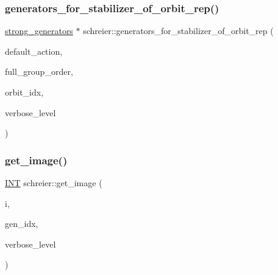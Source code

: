 \subsubsection{\texorpdfstring{generators\+\_\+for\+\_\+stabilizer\+\_\+of\+\_\+orbit\+\_\+rep()}{generators\_for\_stabilizer\_of\_orbit\_rep()}}
{\footnotesize\ttfamily \mbox{\hyperlink{classstrong__generators}{strong\+\_\+generators}} $\ast$ schreier\+::generators\+\_\+for\+\_\+stabilizer\+\_\+of\+\_\+orbit\+\_\+rep (\begin{DoxyParamCaption}\item[{\mbox{\hyperlink{classaction}{action}} $\ast$}]{default\+\_\+action,  }\item[{\mbox{\hyperlink{classlonginteger__object}{longinteger\+\_\+object}} \&}]{full\+\_\+group\+\_\+order,  }\item[{\mbox{\hyperlink{galois_8h_a09fddde158a3a20bd2dcadb609de11dc}{I\+NT}}}]{orbit\+\_\+idx,  }\item[{\mbox{\hyperlink{galois_8h_a09fddde158a3a20bd2dcadb609de11dc}{I\+NT}}}]{verbose\+\_\+level }\end{DoxyParamCaption})}

\mbox{\label{classschreier_a1fd2d08cb31c9e4357e124554ca2773f}} 
\subsubsection{\texorpdfstring{get\+\_\+image()}{get\_image()}}
{\footnotesize\ttfamily \mbox{\hyperlink{galois_8h_a09fddde158a3a20bd2dcadb609de11dc}{I\+NT}} schreier\+::get\+\_\+image (\begin{DoxyParamCaption}\item[{\mbox{\hyperlink{galois_8h_a09fddde158a3a20bd2dcadb609de11dc}{I\+NT}}}]{i,  }\item[{\mbox{\hyperlink{galois_8h_a09fddde158a3a20bd2dcadb609de11dc}{I\+NT}}}]{gen\+\_\+idx,  }\item[{\mbox{\hyperlink{galois_8h_a09fddde158a3a20bd2dcadb609de11dc}{I\+NT}}}]{verbose\+\_\+level }\end{DoxyParamCaption})}

\mbox{\label{classschreier_a9ce0f7c68a27a0703043bcc4a325cd54}} 
